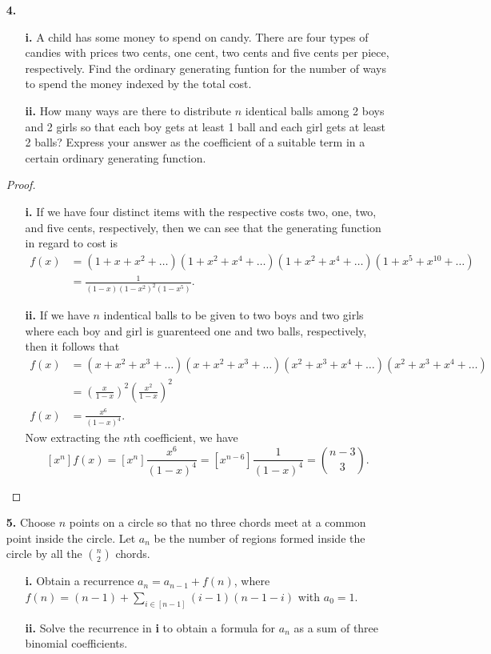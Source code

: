 \documentclass[ 12pt ]{article}
\begin{document}
\begin{enumerate}
	\item[\textbf{4.}]
		\begin{enumerate}
			\item[\textbf{i.}] A child has some money to spend on candy. There are four types of candies with prices two cents, one cent, two cents and five cents per piece,
				respectively. Find the ordinary generating funtion for the number of ways to spend the money indexed by the total cost.
			\item[\textbf{ii.}] How many ways are there to distribute $n$ identical balls among 2 boys and 2 girls so that each boy gets at least 1 ball and each girl gets at least 2
				balls? Express your answer as the coefficient of a suitable term in a certain ordinary generating function.
		\end{enumerate}

		\begin{proof}
			\begin{enumerate}
				\item[\textbf{i.}] If we have four distinct items with the respective costs two, one, two, and five cents, respectively, then we can see that the generating function in
					regard to cost is
					\begin{align*}
						f(x) &= (1 + x + x^2 + \hdots) (1 + x^2 + x^4 + \hdots) (1 + x^2 + x^4 + \hdots) (1 + x^5 + x^{10} + \hdots) \\
						&= \frac{1}{(1 - x)(1 - x^2)^2(1 - x^5)}.
					\end{align*}

				\item[\textbf{ii.}] If we have $n$ indentical balls to be given to two boys and two girls where each boy and girl is guarenteed one and two balls, respectively,
					then it follows that
					\begin{align*}
						f(x) &= (x + x^2 + x^3 + \hdots) (x + x^2 + x^3 + \hdots) (x^2 + x^3 + x^4 + \hdots) (x^2 + x^3 + x^4 + \hdots) \\
						&= \left ( \frac{x}{1 - x} \right )^2 \left ( \frac{x^2}{1 - x} \right )^2 \\
						f(x) &= \frac{x^6}{(1 - x)^4}.
					\end{align*}
					Now extracting the $n$th coefficient, we have $$[x^n] f(x) = [x^n] \frac{x^6}{(1-x)^4} = [x^{n-6}] \frac{1}{(1-x)^4} = \binom{n - 3}{3}.$$
			\end{enumerate}
		\end{proof}


	\item[\textbf{5.}] Choose $n$ points on a circle so that no three chords meet at a common point inside the circle. Let $a_n$ be the number of regions formed inside the circle by all
		the $\binom{n}{2}$ chords.
		\begin{enumerate}
			\item[\textbf{i.}] Obtain a recurrence $a_n = a_{n-1} + f(n)$, where $f(n) = (n - 1) + \sum_{i \in [n-1]} (i - 1)(n - 1 - i)$ with $a_0 = 1$.
			\item[\textbf{ii.}] Solve the recurrence in \textbf{i} to obtain a formula for $a_n$ as a sum of three binomial coefficients.
		\end{enumerate}


\end{enumerate}
\end{document}
